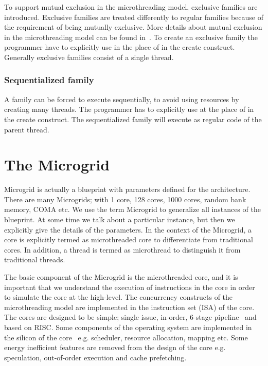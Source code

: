 \documentclass{article}
\begin{document}
To support mutual exclusion in the microthreading model, exclusive families are
introduced. Exclusive families are treated differently to regular families
because of the requirement of being mutually exclusive. More details about
mutual exclusion in the microthreading model can be found
in~\cite[Sec.~14.1]{poss.12}. To create an exclusive family the programmer have
to explicitly use  in the place of  in the create construct.
Generally exclusive families consist of a single thread.

\subsubsection*{Sequentialized family}

A family can be forced to execute sequentially, to avoid using resources by
creating many threads. The programmer has to explicitly use 
at the place of  in the create construct. The sequentialized family will
execute as regular code of the parent thread.

\section{The Microgrid} \label{sn:microgrid}

Microgrid is actually a blueprint with parameters defined for the architecture.
There are many Microgrids; with 1 core, 128 cores, 1000 cores, random bank
memory, COMA etc. We use the term Microgrid to generalize all instances of the
blueprint. At some time we talk about a particular instance, but then we
explicitly give the details of the parameters. In the context of the Microgrid,
a core is explicitly termed as microthreaded core to differentiate from
traditional cores. In addition, a thread is termed as microthread to
distinguish it from traditional threads. 

The basic component of the Microgrid is the microthreaded core, and it is
important that we understand the execution of instructions in the core in order
to simulate the core at the high-level. The concurrency constructs of the
microthreading model are implemented in the instruction set (ISA) of the core.
The cores are designed to be simple; single issue, in-order, 6-stage
pipeline~\cite{Jesshope03} and based on RISC. Some components of the operating
system are implemented in the silicon of the
core~\cite{Cotofana:1998:DCI:945405.938236} e.g. scheduler, resource
allocation, mapping etc. Some energy inefficient features are removed from the
design of the core e.g. speculation, out-of-order execution and cache
prefetching. 
\end{document}
